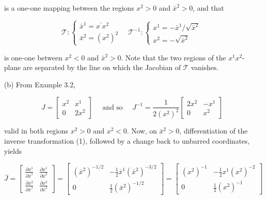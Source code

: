\documentclass[10pt]{article}
\begin{document}
is a one-one mapping between the regions $x^{2}>0$ and $\bar{x}^{2}>0$, and that

\[
\mathscr{T}:\left\{\begin{array}{l}
\bar{x}^{1}=x^{\prime} x^{2}  \tag{2}\\
\bar{x}^{2}=\left(x^{2}\right)^{2}
\end{array} \quad \mathscr{T}^{-1}:\left\{\begin{array}{l}
x^{1}=-\bar{x}^{1} / \sqrt{\bar{x}^{2}} \\
x^{2}=-\sqrt{\bar{x}^{2}}
\end{array}\right.\right.
\]

is one-one between $x^{2}<0$ and $\bar{x}^{2}>0$. Note that the two regions of the $x^{1} x^{2}$-plane are separated by the line on which the Jacobian of $\mathscr{T}$ vanishes.

(b) From Example 3.2,

$$
J=\left[\begin{array}{cc}
x^{2} & x^{1} \\
0 & 2 x^{2}
\end{array}\right] \quad \text { and so } \quad J^{-1}=\frac{1}{2\left(x^{2}\right)^{2}}\left[\begin{array}{cc}
2 x^{2} & -x^{1} \\
0 & x^{2}
\end{array}\right]
$$

valid in both regions $x^{2}>0$ and $x^{2}<0$. Now, on $\bar{x}^{2}>0$, differentiation of the inverse transformation (1), followed by a change back to unbarred coordinates, yields

$$
\bar{J}=\left[\begin{array}{ll}
\frac{\partial x^{1}}{\partial \bar{x}^{1}} & \frac{\partial x^{1}}{\partial \bar{x}^{2}} \\
\frac{\partial x^{2}}{\partial \bar{x}^{1}} & \frac{\partial x^{2}}{\partial \bar{x}^{2}}
\end{array}\right]=\left[\begin{array}{cc}
\left(\bar{x}^{2}\right)^{-1 / 2} & -\frac{1}{2} \bar{x}^{1}\left(\bar{x}^{2}\right)^{-3 / 2} \\
0 & \frac{1}{2}\left(\bar{x}^{2}\right)^{-1 / 2}
\end{array}\right]=\left[\begin{array}{cc}
\left(x^{2}\right)^{-1} & -\frac{1}{2} x^{1}\left(x^{2}\right)^{-2} \\
0 & \frac{1}{2}\left(x^{2}\right)^{-1}
\end{array}\right]
$$
\end{document}

